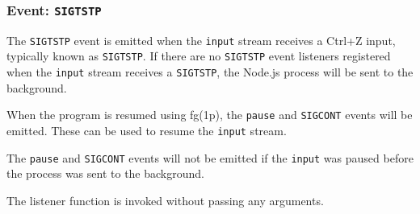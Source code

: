 \begin{Shaded}
\begin{Highlighting}[]
\NormalTok{(}\OperatorTok{,}\NormalTok{ () }\KeywordTok{=\textgreater{}}\NormalTok{ \{}
\NormalTok{(}\OperatorTok{,}\KeywordTok{=\textgreater{}}\NormalTok{ \{}
    \NormalTok{(}\SpecialStringTok{/}\SpecialCharTok{\^{}}\SpecialCharTok{(}\NormalTok{()}\OperatorTok{;}
\NormalTok{  \})}\OperatorTok{;}
\NormalTok{\})}\OperatorTok{;}
\end{Highlighting}
\end{Shaded}

\subsubsection{\texorpdfstring{Event:
\texttt{\textquotesingle{}SIGTSTP\textquotesingle{}}}{Event: \textquotesingle SIGTSTP\textquotesingle{}}}\label{event-sigtstp}

The \texttt{\textquotesingle{}SIGTSTP\textquotesingle{}} event is
emitted when the \texttt{input} stream receives a Ctrl+Z input,
typically known as \texttt{SIGTSTP}. If there are no
\texttt{\textquotesingle{}SIGTSTP\textquotesingle{}} event listeners
registered when the \texttt{input} stream receives a \texttt{SIGTSTP},
the Node.js process will be sent to the background.

When the program is resumed using fg(1p), the
\texttt{\textquotesingle{}pause\textquotesingle{}} and
\texttt{\textquotesingle{}SIGCONT\textquotesingle{}} events will be
emitted. These can be used to resume the \texttt{input} stream.

The \texttt{\textquotesingle{}pause\textquotesingle{}} and
\texttt{\textquotesingle{}SIGCONT\textquotesingle{}} events will not be
emitted if the \texttt{input} was paused before the process was sent to
the background.

The listener function is invoked without passing any arguments.

\begin{Shaded}
\begin{Highlighting}[]
\NormalTok{(}\OperatorTok{,}\NormalTok{ () }\KeywordTok{=\textgreater{}}\NormalTok{ \{}
  \NormalTok{(}\NormalTok{)}\OperatorTok{;}
\NormalTok{\})}\OperatorTok{;}
\end{Highlighting}
\end{Shaded}

